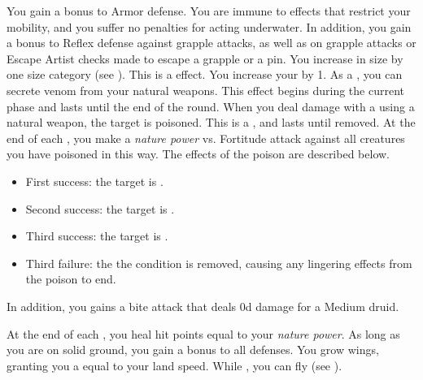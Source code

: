          You gain a  bonus to Armor defense.
         You are immune to effects that restrict your mobility, and you suffer no penalties for acting underwater.
        In addition, you gain a  bonus to Reflex defense against grapple attacks, as well as on grapple attacks or Escape Artist checks made to escape a grapple or a pin.
        You increase in size by one size category (see ).
        This is a  effect.
        You increase your  by 1.
        As a , you can secrete venom from your natural weapons.
        This effect begins during the current phase and lasts until the end of the round.
        When you deal damage with a  using a natural weapon, the target is poisoned.
        This is a , and lasts until removed.
        At the end of each , you make a \textit{nature power} vs. Fortitude attack against all creatures you have poisoned in this way.
        The effects of the poison are described below.
        \begin{itemize}
            \item First success: the target is \sickened.
            \item Second success: the target is \nauseated.
            \item Third success: the target is \paralyzed.
            \item Third failure: the the condition is removed, causing any lingering effects from the poison to end.
        \end{itemize}
        \par In addition, you gains a bite attack that deals \plus0d damage for a Medium druid.

        At the end of each , you heal hit points equal to your \textit{nature power}.
         As long as you are on solid ground, you gain a  bonus to all defenses.
        You grow wings, granting you a  equal to your land speed.
        While , you can fly (see ).

